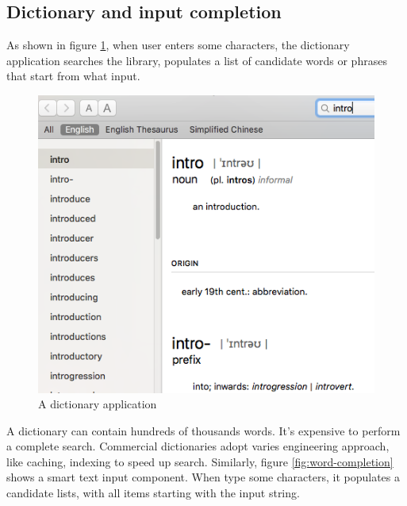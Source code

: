 \documentclass[b5paper]{article}
\begin{document}
\subsection{Dictionary and input completion}
As shown in figure \ref{fig:e-dict}, when user enters some characters, the dictionary application searches the library, populates a list of candidate words or phrases that start from what input.

\begin{figure}[htbp]
  \centering
  \includegraphics[scale=0.4]{img/edict-en.png}
  \caption{A dictionary application}
  \label{fig:e-dict}
\end{figure}

A dictionary can contain hundreds of thousands words. It's expensive to perform a complete search. Commercial dictionaries adopt varies engineering approach, like caching, indexing to speed up search. Similarly, figure \ref{fig:word-completion} shows a smart text input component. When type some characters, it populates a candidate lists, with all items starting with the input string.
\end{document}
